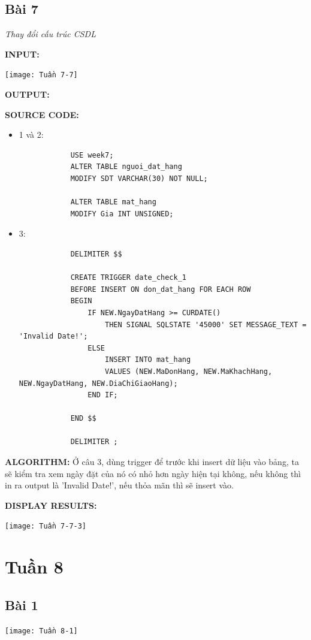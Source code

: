 \documentclass[12pt,a4paper]{report}
\begin{document}
\subsection{Bài 7}
	\begin{center}
		{\it Thay đổi cấu trúc CSDL}
	\end{center}
	
	{\bf INPUT:}
	\begin{center}
		\texttt{[image: Tuần 7-7]}
	\end{center}
	
	{\bf OUTPUT:}
	
	{\bf SOURCE CODE:}
	\begin{itemize}
		\item 1 và 2:
		\begin{lstlisting}
			USE week7;
			ALTER TABLE nguoi_dat_hang
			MODIFY SDT VARCHAR(30) NOT NULL;

			ALTER TABLE mat_hang
			MODIFY Gia INT UNSIGNED;
		\end{lstlisting}
		\item 3:
		\begin{lstlisting}
			DELIMITER $$

			CREATE TRIGGER date_check_1
			BEFORE INSERT ON don_dat_hang FOR EACH ROW
			BEGIN
				IF NEW.NgayDatHang >= CURDATE()
					THEN SIGNAL SQLSTATE '45000' SET MESSAGE_TEXT = 'Invalid Date!';
				ELSE 
					INSERT INTO mat_hang
        			VALUES (NEW.MaDonHang, NEW.MaKhachHang, NEW.NgayDatHang, NEW.DiaChiGiaoHang);
				END IF;
    
			END $$

			DELIMITER ;
		\end{lstlisting}
	\end{itemize}
	
	{\bf ALGORITHM:} Ở câu 3, dùng trigger để trước khi insert dữ liệu vào bảng, ta sẽ kiểm tra xem ngày đặt của nó có nhỏ hơn ngày hiện tại không, nếu không thì in ra output là 'Invalid Date!', nếu thỏa mãn thì sẽ insert vào.
	
	{\bf DISPLAY RESULTS:}
	\begin{center}
		\texttt{[image: Tuần 7-7-3]}
	\end{center}

\section{Tuần 8}
\subsection{Bài 1}
	\begin{center}
		\texttt{[image: Tuần 8-1]}
	\end{center}
	
\end{document}
